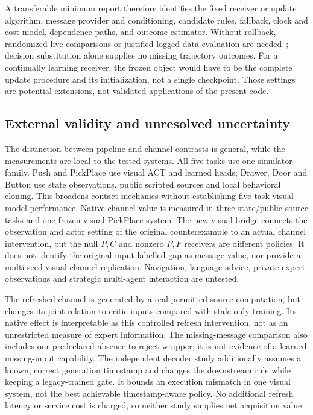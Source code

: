 A transferable minimum report therefore identifies the fixed receiver or update algorithm, message provider and conditioning, candidate rules, fallback, clock and cost model, dependence paths, and outcome estimator. Without rollback, randomized live comparisons or justified logged-data evaluation are needed~\cite{dudik,jiang,thomas}; decision substitution alone supplies no missing trajectory outcomes. For a continually learning receiver, the frozen object would have to be the complete update procedure and its initialization, not a single checkpoint. Those settings are potential extensions, not validated applications of the present code.

\subsection{External validity and unresolved uncertainty}
The distinction between pipeline and channel contrasts is general, while the measurements are local to the tested systems. All five tasks use one simulator family. Push and PickPlace use visual ACT and learned heads; Drawer, Door and Button use state observations, public scripted sources and local behavioral cloning. This broadens contact mechanics without establishing five-task visual-model performance. Native channel value is measured in three state/public-source tasks and one frozen visual PickPlace system. The new visual bridge connects the observation and actor setting of the original counterexample to an actual channel intervention, but the null $P,C$ and nonzero $P,F$ receivers are different policies. It does not identify the original input-labelled gap as message value, nor provide a multi-seed visual-channel replication. Navigation, language advice, private expert observations and strategic multi-agent interaction are untested.

The refreshed channel is generated by a real permitted source computation, but changes its joint relation to critic inputs compared with stale-only training. Its native effect is interpretable as this controlled refresh intervention, not as an unrestricted measure of expert information. The missing-message comparison also includes our predeclared absence-to-reject wrapper; it is not evidence of a learned missing-input capability. The independent decoder study additionally assumes a known, correct generation timestamp and changes the downstream rule while keeping a legacy-trained gate. It bounds an execution mismatch in one visual system, not the best achievable timestamp-aware policy. No additional refresh latency or service cost is charged, so neither study supplies net acquisition value.

